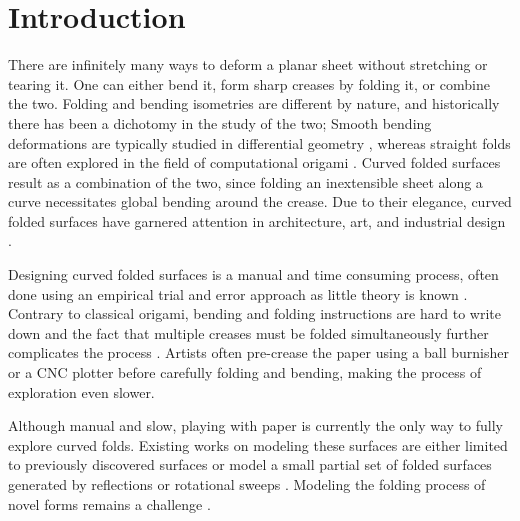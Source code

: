 \section{Introduction}
There are infinitely many ways to deform a planar sheet without stretching or tearing it. One can either bend it, form sharp creases by folding it, or combine the two. Folding and bending isometries are different by nature, and historically there has been a dichotomy in the study of the two; Smooth bending deformations are typically studied in differential geometry \cite{do_carmo}, whereas straight folds are often explored in the field of computational origami \cite{origami_book}. Curved folded surfaces \cite{huffman} result as a combination of the two, since folding an inextensible sheet along a curve necessitates global bending around the crease. Due to their elegance, curved folded surfaces have garnered attention in architecture, art, and industrial design \cite{arch_geom,tachi2013composite,tachi2011one,buri2011curved,robofold,curved_review}.

Designing curved folded surfaces is a manual and time consuming process, often done using an empirical trial and error approach as little theory is known \cite{curved_review,huffmann_reconstructing}. Contrary to classical origami, bending and folding instructions are hard to write down and the fact that multiple creases must be folded simultaneously further complicates the process \cite{StringActuated:2017}. Artists often pre-crease the paper using a ball burnisher or a CNC plotter before carefully folding and bending, making the process of exploration even slower. 

Although manual and slow, playing with paper is currently the only way to fully explore curved folds. Existing works on modeling these surfaces are either limited to previously discovered surfaces \cite{curved_folding_kilian,StringActuated:2017} or model a small partial set of folded surfaces generated by reflections or rotational sweeps \cite{Mitani_ref,mitani2009design}. Modeling the folding process of novel forms remains a challenge \cite{curved_review}. 

